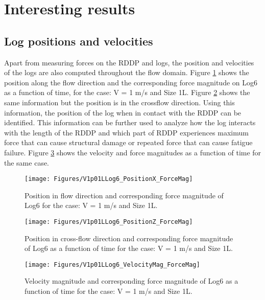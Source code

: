 \FloatBarrier
\section{Interesting results}
\FloatBarrier
\subsection{Log positions and velocities}
Apart from measuring forces on the RDDP and logs, the position and velocities of the logs are also computed throughout the flow domain. Figure \ref{fig:V1p01LLog6_PositionX_ForceMag} shows the position along the flow direction and the corresponding force magnitude on Log6 as a function of time, for the case: V = 1 m/s and Size 1L. Figure \ref{fig:V1p01LLog6_PositionZ_ForceMag} shows the same information but the position is in the crossflow direction. Using this information, the position of the log when in contact with the RDDP can be identified. This information can be further used to analyze how the log interacts with the length of the RDDP and which part of RDDP experiences maximum force that can cause structural damage or repeated force that can cause fatigue failure. Figure \ref{fig:V1p01LLog6_VelocityMag_ForceMag} shows the velocity and force magnitudes as a function of time for the same case. 

\begin{figure}
\centering
\texttt{[image: Figures/V1p01LLog6\_PositionX\_ForceMag]}
\caption{\label{fig:V1p01LLog6_PositionX_ForceMag}Position in flow direction and corresponding force magnitude of Log6 for the case: V = 1 m/s and Size 1L.}
\end{figure}
\begin{figure}
\centering
\texttt{[image: Figures/V1p01LLog6\_PositionZ\_ForceMag]}
\caption{\label{fig:V1p01LLog6_PositionZ_ForceMag}Position in cross-flow direction and corresponding force magnitude of Log6 as a function of time for the case: V = 1 m/s and Size 1L.}
\end{figure}
\begin{figure}
\centering
\texttt{[image: Figures/V1p01LLog6\_VelocityMag\_ForceMag]}
\caption{\label{fig:V1p01LLog6_VelocityMag_ForceMag}Velocity magnitude and corresponding force magnitude of Log6 as a function of time for the case: V = 1 m/s and Size 1L.}
\end{figure}

